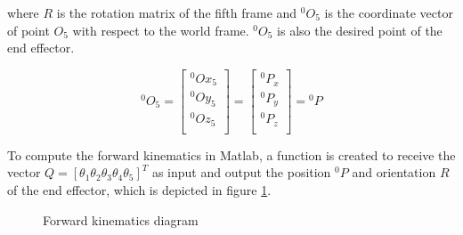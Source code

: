 \documentclass{article}
\begin{document}
where $R$ is the rotation matrix of the fifth frame and ${}^0O_5$ is the coordinate vector of point $O_5$ with respect to the world frame. ${}^0O_5$  is also the desired point of the end effector.

\begin{equation*}
{}^0O_5 = \left[
\begin{array}{c}
	{}^0Ox_5 \\
	{}^0Oy_5 \\
	{}^0Oz_5 \\
\end{array}
\right] = \left[
\begin{array}{c}
	{}^0P_x \\
	{}^0P_y \\
	{}^0P_z \\
\end{array}
\right] = {}^0P
\end{equation*}

To compute the forward kinematics in Matlab, a function is created to receive the vector $Q=[\theta_1 \theta_2 \theta_3 \theta_4 \theta_5]^T$ as input and output the position ${}^0P$ and orientation $R$ of the end effector, which is depicted in figure \ref{fig:forward.block_diagram}.

\begin{figure}[htbp] 
\begin{center}
\caption{Forward kinematics diagram}
\label{fig:forward.block_diagram}
\end{center}
\end{figure}
\end{document}
